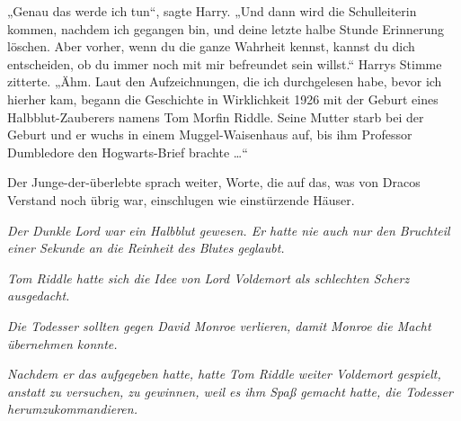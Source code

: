 „Genau das werde ich tun“, sagte Harry.
„Und dann wird die Schulleiterin kommen, nachdem ich gegangen bin, und deine letzte halbe Stunde Erinnerung löschen. Aber vorher, wenn du die ganze Wahrheit kennst, kannst du dich entscheiden, ob du immer noch mit mir befreundet sein willst.“
Harrys Stimme zitterte.
„Ähm. Laut den Aufzeichnungen, die ich durchgelesen habe, bevor ich hierher kam, begann die Geschichte in Wirklichkeit 1926 mit der Geburt eines Halbblut-Zauberers namens Tom Morfin Riddle. Seine Mutter starb bei der Geburt und er wuchs in einem Muggel-Waisenhaus auf, bis ihm Professor Dumbledore den Hogwarts-Brief brachte …“

Der Junge-der-überlebte sprach weiter, Worte, die auf das, was von Dracos Verstand noch übrig war, einschlugen wie einstürzende Häuser.

\emph{Der Dunkle Lord war ein Halbblut gewesen. Er hatte nie auch nur den Bruchteil einer Sekunde an die Reinheit des Blutes geglaubt.}

\emph{Tom Riddle hatte sich die Idee von Lord Voldemort als schlechten Scherz ausgedacht.}

\emph{Die Todesser sollten gegen David Monroe verlieren, damit Monroe die Macht übernehmen konnte.}

\emph{Nachdem er das aufgegeben hatte, hatte Tom Riddle weiter Voldemort gespielt, anstatt zu versuchen, zu gewinnen, weil es ihm Spaß gemacht hatte, die Todesser herumzukommandieren.}

